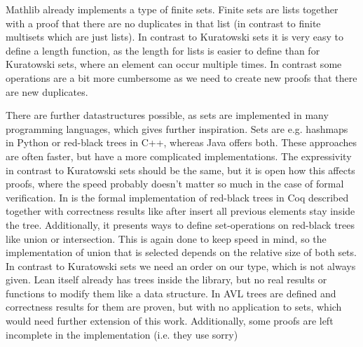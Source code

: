 \documentclass{article}
\begin{document}
Mathlib already implements a type of finite sets.\cite{leanfinset} Finite sets are lists together with a proof that there are no duplicates in that list (in contrast to finite multisets which are just lists). In contrast to Kuratowski sets it is very easy to define a length function, as the length for lists is easier to define than for Kuratowski sets, where an element can occur multiple times. In contrast some operations are a bit more cumbersome as we need to create new proofs that there are new duplicates.

There are further datastructures possible, as sets are implemented in many programming languages, which gives further inspiration. Sets are e.g. hashmaps in Python or red-black trees in C++, whereas Java offers both.
These approaches are often faster, but have a more complicated implementations. The expressivity in contrast to Kuratowski sets should be the same, but it is open how this affects proofs, where the speed probably doesn't matter so much in the case of formal verification.
In \cite{redblacktree} is the formal implementation of red-black trees in Coq described together with correctness results like after insert all previous elements stay inside the tree. Additionally, it presents ways to define set-operations on red-black trees like union or intersection. This is again done to keep speed in mind, so the implementation of union that is selected depends on the relative size of both sets. In contrast to Kuratowski sets we need an order on our type, which is not always given.
Lean itself already has trees inside the library, but no real results or functions to modify them like a data structure. In \cite{avl} AVL trees are defined and correctness results for them are proven, but with no application to sets, which would need further extension of this work. Additionally, some proofs are left incomplete in the implementation (i.e. they use sorry)
\end{document}
